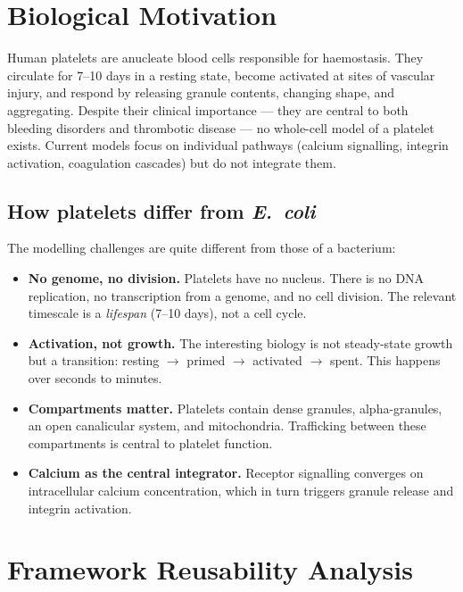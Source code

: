 \documentclass[11pt,a4paper]{article}
\begin{document}
\section{Biological Motivation}

Human platelets are anucleate blood cells responsible for haemostasis.  They
circulate for 7--10 days in a resting state, become activated at sites of
vascular injury, and respond by releasing granule contents, changing shape,
and aggregating.  Despite their clinical importance --- they are central to
both bleeding disorders and thrombotic disease --- no whole-cell model of a
platelet exists.  Current models focus on individual pathways (calcium
signalling, integrin activation, coagulation cascades) but do not integrate
them.

\subsection{How platelets differ from \textit{E.~coli}}

The modelling challenges are quite different from those of a bacterium:

\begin{itemize}[nosep]
  \item \textbf{No genome, no division.}  Platelets have no nucleus.  There
        is no DNA replication, no transcription from a genome, and no cell
        division.  The relevant timescale is a \emph{lifespan} (7--10 days),
        not a cell cycle.
  \item \textbf{Activation, not growth.}  The interesting biology is not
        steady-state growth but a transition: resting $\to$ primed $\to$
        activated $\to$ spent.  This happens over seconds to minutes.
  \item \textbf{Compartments matter.}  Platelets contain dense granules,
        alpha-granules, an open canalicular system, and mitochondria.
        Trafficking between these compartments is central to platelet
        function.
  \item \textbf{Calcium as the central integrator.}  Receptor signalling
        converges on intracellular calcium concentration, which in turn
        triggers granule release and integrin activation.
\end{itemize}


\section{Framework Reusability Analysis}
\label{sec:reuse}
\end{document}
